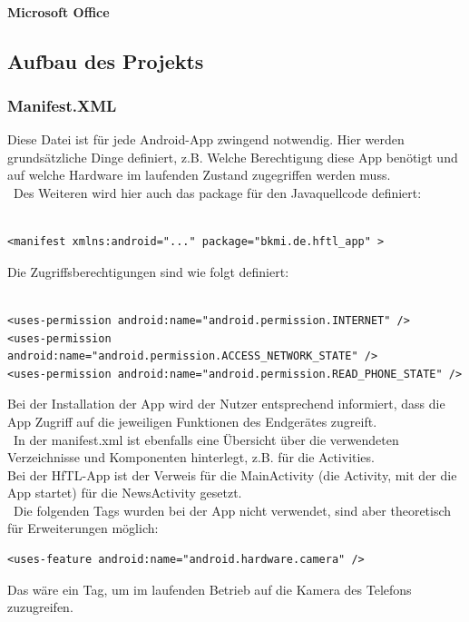 \paragraph{Microsoft Office}

\subsection{Aufbau des Projekts}
\subsubsection{Manifest.XML}
Diese Datei ist für jede Android-App zwingend notwendig. Hier werden grundsätzliche Dinge definiert, z.B. Welche Berechtigung diese App benötigt und auf welche Hardware im laufenden Zustand zugegriffen werden muss.
\\\
Des Weiteren wird hier auch das package für den Javaquellcode definiert:\\\
\lstset{language=XML}
\begin{lstlisting}[caption={AndroidManifest.XML},label=package, frame=single]
<manifest xmlns:android="..." package="bkmi.de.hftl_app" >
\end{lstlisting}
Die Zugriffsberechtigungen sind wie folgt definiert:\\\

\begin{lstlisting}[caption={AndroidManifest.XML},label=permissions, frame=single]
<uses-permission android:name="android.permission.INTERNET" />
<uses-permission android:name="android.permission.ACCESS_NETWORK_STATE" />
<uses-permission android:name="android.permission.READ_PHONE_STATE" />
\end{lstlisting}
Bei der Installation der App wird der Nutzer entsprechend informiert, dass die App Zugriff auf die jeweiligen Funktionen des Endgerätes zugreift.
 \\\
In der manifest.xml ist ebenfalls eine Übersicht über die verwendeten Verzeichnisse und Komponenten hinterlegt, z.B. für die Activities.\\
Bei der HfTL-App ist der Verweis für die MainActivity (die Activity, mit der die App startet) für die NewsActivity gesetzt.
 \\\ 
Die folgenden Tags wurden bei der App nicht verwendet, sind aber theoretisch für Erweiterungen möglich:
\begin{lstlisting}[caption={Zugriffsbeispiel},label=perm-examble, frame=single]
<uses-feature android:name="android.hardware.camera" />
\end{lstlisting}
Das wäre ein Tag, um im laufenden Betrieb auf die Kamera des Telefons zuzugreifen.

